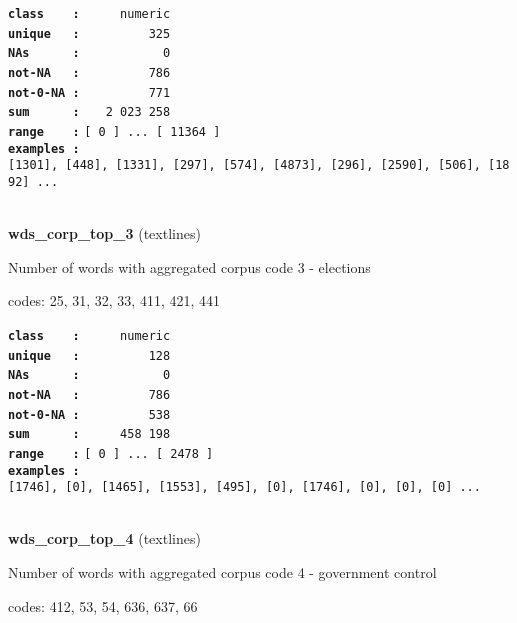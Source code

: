 \documentclass[]{article}
\begin{document}
\textbf{\texttt{class\ \ \ \ :}} \texttt{~~~~~numeric}\\
\textbf{\texttt{unique\ \ \ :}} \texttt{~~~~~~~~~325}\\
\textbf{\texttt{NAs\ \ \ \ \ \ :}} \texttt{~~~~~~~~~~~0}\\
\textbf{\texttt{not-NA\ \ \ :}} \texttt{~~~~~~~~~786}\\
\textbf{\texttt{not-0-NA\ :}} \texttt{~~~~~~~~~771}\\
\textbf{\texttt{sum\ \ \ \ \ \ :}} \texttt{~~~2~023~258}\\
\textbf{\texttt{range\ \ \ \ :}}
\texttt{{[}\ 0\ {]}\ ...\ {[}\ 11364\ {]}}\\
\textbf{\texttt{examples\ :}}
\texttt{{[}1301{]},\ {[}448{]},\ {[}1331{]},\ {[}297{]},\ {[}574{]},\ {[}4873{]},\ {[}296{]},\ {[}2590{]},\ {[}506{]},\ {[}1892{]}\ ...}\\

~

\textbf{wds\_corp\_top\_3} (textlines)

Number of words with aggregated corpus code 3 - elections

codes: 25, 31, 32, 33, 411, 421, 441

\textbf{\texttt{class\ \ \ \ :}} \texttt{~~~~~numeric}\\
\textbf{\texttt{unique\ \ \ :}} \texttt{~~~~~~~~~128}\\
\textbf{\texttt{NAs\ \ \ \ \ \ :}} \texttt{~~~~~~~~~~~0}\\
\textbf{\texttt{not-NA\ \ \ :}} \texttt{~~~~~~~~~786}\\
\textbf{\texttt{not-0-NA\ :}} \texttt{~~~~~~~~~538}\\
\textbf{\texttt{sum\ \ \ \ \ \ :}} \texttt{~~~~~458~198}\\
\textbf{\texttt{range\ \ \ \ :}}
\texttt{{[}\ 0\ {]}\ ...\ {[}\ 2478\ {]}}\\
\textbf{\texttt{examples\ :}}
\texttt{{[}1746{]},\ {[}0{]},\ {[}1465{]},\ {[}1553{]},\ {[}495{]},\ {[}0{]},\ {[}1746{]},\ {[}0{]},\ {[}0{]},\ {[}0{]}\ ...}\\

~

\textbf{wds\_corp\_top\_4} (textlines)

Number of words with aggregated corpus code 4 - government control

codes: 412, 53, 54, 636, 637, 66
\end{document}
